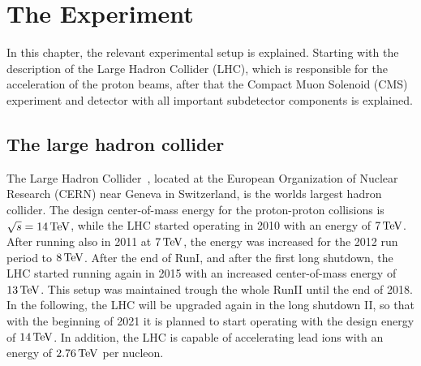 \chapter{The Experiment}\label{chap:experiment}
In this chapter, the relevant experimental setup is explained. Starting with the description of the Large Hadron Collider (LHC), which is responsible for the acceleration of the proton beams, after that the Compact Muon Solenoid (CMS) experiment and detector with all important subdetector components is explained.
\section{The large hadron collider}\label{sec:LHC}
The Large Hadron Collider~\cite{LHC1,LHC2}, located at the European Organization of Nuclear Research (CERN) near Geneva in Switzerland, is the worlds largest hadron collider. The design center-of-mass energy for the proton-proton collisions is $\sqrt{s}=14\,\text{Te\hspace{-.08em}V}$, while the LHC started operating in 2010 with an energy of $7\,\text{Te\hspace{-.08em}V}$. After running also in 2011 at $7\,\text{Te\hspace{-.08em}V}$, the energy was increased for the 2012 run period to $8\,\text{Te\hspace{-.08em}V}$. After the end of RunI, and after the first long shutdown, the LHC started running again in 2015 with an increased center-of-mass energy of $13\,\text{Te\hspace{-.08em}V}$. This setup was maintained trough the whole RunII until the end of 2018. In the following, the LHC will be upgraded again in the long shutdown II, so that with the beginning of 2021 it is planned to start operating with the design energy of $14\,\text{Te\hspace{-.08em}V}$.
In addition, the LHC is capable of accelerating lead ions with an energy of $2.76\,\text{Te\hspace{-.08em}V}$ per nucleon.\\
